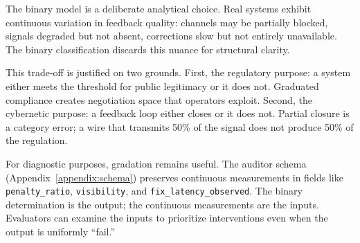 \documentclass{article}
\begin{document}
The binary model is a deliberate analytical choice. Real systems exhibit continuous variation in feedback quality: channels may be partially blocked, signals degraded but not absent, corrections slow but not entirely unavailable. The binary classification discards this nuance for structural clarity.

This trade-off is justified on two grounds. First, the regulatory purpose: a system either meets the threshold for public legitimacy or it does not. Graduated compliance creates negotiation space that operators exploit. Second, the cybernetic purpose: a feedback loop either closes or it does not. Partial closure is a category error; a wire that transmits 50\% of the signal does not produce 50\% of the regulation.

For diagnostic purposes, gradation remains useful. The auditor schema (Appendix~\ref{appendix:schema}) preserves continuous measurements in fields like \texttt{penalty\_ratio}, \texttt{visibility}, and \texttt{fix\_latency\_observed}. The binary determination is the output; the continuous measurements are the inputs. Evaluators can examine the inputs to prioritize interventions even when the output is uniformly ``fail.''
\end{document}
